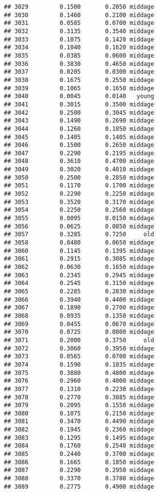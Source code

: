 \documentclass[
]{article}
\begin{document}
\begin{verbatim}
## 3029         0.1500       0.2050 middage
## 3030         0.1460       0.2100 middage
## 3031         0.0585       0.0700 middage
## 3032         0.3135       0.3540 middage
## 3033         0.1075       0.1420 middage
## 3034         0.1040       0.1620 middage
## 3035         0.0385       0.0600 middage
## 3036         0.3830       0.4650 middage
## 3037         0.0205       0.0300 middage
## 3038         0.1675       0.2550 middage
## 3039         0.1065       0.1650 middage
## 3040         0.0045       0.0140   young
## 3041         0.3015       0.3500 middage
## 3042         0.2500       0.3045 middage
## 3043         0.1490       0.2690 middage
## 3044         0.1260       0.1850 middage
## 3045         0.1405       0.1405 middage
## 3046         0.1500       0.2650 middage
## 3047         0.2290       0.2195 middage
## 3048         0.3610       0.4700 middage
## 3049         0.3020       0.4010 middage
## 3050         0.2500       0.2850 middage
## 3051         0.1170       0.1700 middage
## 3052         0.2290       0.2250 middage
## 3053         0.3520       0.3170 middage
## 3054         0.2250       0.2560 middage
## 3055         0.0095       0.0150 middage
## 3056         0.0625       0.0850 middage
## 3057         0.3285       0.7250     old
## 3058         0.0480       0.0650 middage
## 3060         0.1145       0.1395 middage
## 3061         0.2915       0.3085 middage
## 3062         0.0630       0.1650 middage
## 3063         0.2345       0.2945 middage
## 3064         0.2545       0.3150 middage
## 3065         0.2285       0.2830 middage
## 3066         0.3940       0.4400 middage
## 3067         0.1890       0.2700 middage
## 3068         0.0935       0.1350 middage
## 3069         0.0455       0.0670 middage
## 3070         0.0725       0.0800 middage
## 3071         0.2000       0.3750     old
## 3072         0.3060       0.3950 middage
## 3073         0.0565       0.0700 middage
## 3074         0.1590       0.1035 middage
## 3075         0.3880       0.4800 middage
## 3076         0.2960       0.4000 middage
## 3077         0.1310       0.2230 middage
## 3078         0.2770       0.3885 middage
## 3079         0.2095       0.1550 middage
## 3080         0.1075       0.2150 middage
## 3081         0.3470       0.4490 middage
## 3082         0.1945       0.2360 middage
## 3083         0.1295       0.1495 middage
## 3084         0.1760       0.2540 middage
## 3085         0.2440       0.3700 middage
## 3086         0.1665       0.1850 middage
## 3087         0.2290       0.2950 middage
## 3088         0.3370       0.3780 middage
## 3089         0.2775       0.4900 middage

\end{verbatim}
\end{document}
